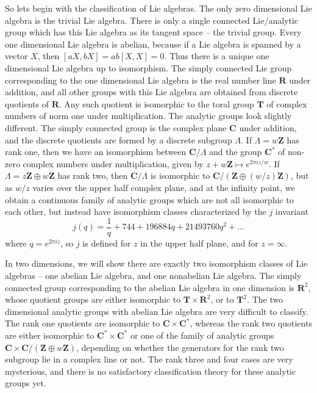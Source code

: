 So lets begin with the classification of Lie algebras. The only zero dimensional Lie algebra is the trivial Lie algebra. There is only a single connected Lie/analytic group which has this Lie algebra as its tangent space -- the trivial group. Every one dimensional Lie algebra is abelian, because if a Lie algebra is spanned by a vector $X$, then $[aX, bX] = ab[X,X] = 0$. Thus there is a unique one dimensional Lie algebra up to isomorphism. The simply connected Lie group corresponding to the one dimensional Lie algebra is the real number line $\mathbf{R}$ under addition, and all other groups with this Lie algebra are obtained from discrete quotients of $\mathbf{R}$. Any such quotient is isomorphic to the toral group $\mathbf{T}$ of complex numbers of norm one under multiplication. The analytic groups look slightly different. The simply connected group is the complex plane $\mathbf{C}$ under addition, and the discrete quotients are formed by a discrete subgroup $\Lambda$. If $\Lambda = w\mathbf{Z}$ has rank one, then we have an isomorphism between $\mathbf{C}/\Lambda$ and the group $\mathbf{C}^*$ of non-zero complex numbers under multiplication, given by $z + w\mathbf{Z} \mapsto e^{2 \pi i z/w}$. If $\Lambda = z\mathbf{Z} \oplus w\mathbf{Z}$ has rank two, then $\mathbf{C}/\Lambda$ is isomorphic to $\mathbf{C}/(\mathbf{Z} \oplus (w/z) \mathbf{Z})$, but as $w/z$ varies over the upper half complex plane, and at the infinity point, we obtain a continuous family of analytic groups which are not all isomorphic to each other, but instead have isomorphism classes characterized by the $j$ invariant
%
\[ j(q) = \frac{1}{q} + 744 + 196884q + 21493760q^2 + \dots \]
%
where $q = e^{2 \pi i z}$, so $j$ is defined for $z$ in the upper half plane, and for $z = \infty$.

In two dimensions, we will show there are exactly two isomorphism classes of Lie algebras -- one abelian Lie algebra, and one nonabelian Lie algebra. The simply connected group corresponding to the abelian Lie algebra in one dimension is $\mathbf{R}^2$, whose quotient groups are either isomorphic to $\mathbf{T} \times \mathbf{R}^2$, or to $\mathbf{T}^2$. The two dimensional analytic groups with abelian Lie algebra are very difficult to classify. The rank one quotients are isomorphic to $\mathbf{C} \times \mathbf{C}^*$, whereas the rank two quotients are either isomorphic to $\mathbf{C}^* \times \mathbf{C}^*$ or one of the family of analytic groups $\mathbf{C} \times \mathbf{C}/(\mathbf{Z} \oplus w\mathbf{Z})$, depending on whether the generators for the rank two subgroup lie in a complex line or not. The rank three and four cases are very mysterious, and there is no satisfactory classification theory for these analytic groups yet.

